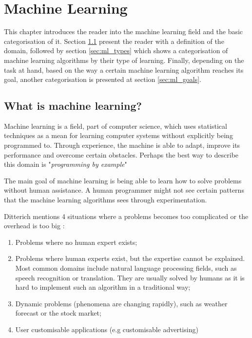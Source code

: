 \chapter{Machine Learning}
\label{chap:ml}

\qquad This chapter introduces the reader into the machine learning field and the basic categorisation of it. Section \ref{sec:ml_what} present the reader with a definition of the domain, followed by section \ref{sec:ml_types} which shows a categorisation of machine learning algorithms by their type of learning. Finally, depending on the task at hand, based on the way a certain machine learning algorithm reaches its goal, another categorisation is presented at section \ref{sec:ml_goals}.
\section{What is machine learning?}
\label{sec:ml_what}

\qquad Machine learning is a field, part of computer science, which uses statistical techniques as a mean for learning computer systems without explicitly being programmed to. Through experience, the machine is able to adapt, improve its performance and overcome certain obstacles. Perhaps the best way to describe this domain is "\textit{programming by example}" \cite{modernapproach}

\qquad The main goal of machine learning is being able to learn how to solve problems without human assistance. A human programmer might not see certain patterns that the machine learning algorithms sees through experimentation.

\qquad Ditterich mentions 4 situations where a problems becomes too complicated or the overhead is too big \cite{modernapproach}:

\begin{enumerate}
\item{Problems where no human expert exists;}
\item{Problems where human experts exist, but the expertise cannot be explained. Most common domains include natural language processing fields, such as speech recognition or translation. They are usually solved by humans as it is hard to implement such an algorithm in a traditional way;}
\item{Dynamic problems (phenomena are changing rapidly), such as weather forecast or the stock market;}
\item{User customisable applications (e.g customisable advertising)}
\end{enumerate}

